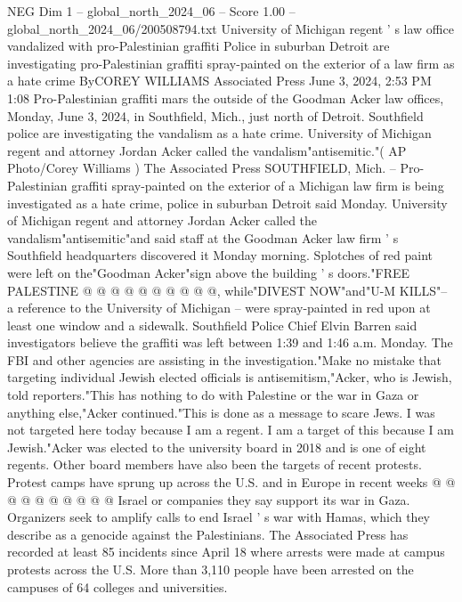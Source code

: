 \begin{textsample}{NEG Dim 1 – global\_north\_2024\_06 – Score 1.00 – global\_north\_2024\_06/200508794.txt}  \label{ex:f1_neg_216}
University of Michigan regent ' s law office vandalized with pro-Palestinian graffiti Police in suburban Detroit are investigating pro-Palestinian graffiti spray-painted on the exterior of a law firm as a hate crime ByCOREY WILLIAMS Associated Press June 3, 2024, 2:53 PM 1:08 Pro-Palestinian graffiti mars the outside of the Goodman Acker law offices, Monday, June 3, 2024, in Southfield, Mich., just north of Detroit.
Southfield police are investigating the vandalism as a hate crime.
University of Michigan regent and attorney Jordan Acker called the vandalism"antisemitic."( AP Photo/Corey Williams ) The Associated Press SOUTHFIELD, Mich. -- Pro-Palestinian graffiti spray-painted on the exterior of a Michigan law firm is being investigated as a hate crime, police in suburban Detroit said Monday.
University of Michigan regent and attorney Jordan Acker called the vandalism"antisemitic"and said staff at the Goodman Acker law firm ' s Southfield headquarters discovered it Monday morning.
Splotches of red paint were left on the"Goodman Acker"sign above the building ' s doors."FREE PALESTINE @ @ @ @ @ @ @ @ @ @, while"DIVEST NOW"and"U-M KILLS"-- a reference to the University of Michigan -- were spray-painted in red upon at least one window and a sidewalk.
Southfield Police Chief Elvin Barren said investigators believe the graffiti was left between 1:39 and 1:46 a.m.
Monday.
The FBI and other agencies are assisting in the investigation."Make no mistake that targeting individual Jewish elected officials is antisemitism,"Acker, who is Jewish, told reporters."This has nothing to do with Palestine or the war in Gaza or anything else,"Acker continued."This is done as a message to scare Jews.
I was not targeted here today because I am a regent.
I am a target of this because I am Jewish."Acker was elected to the university board in 2018 and is one of eight regents.
Other board members have also been the targets of recent protests.
Protest camps have sprung up across the U.S. and in Europe in recent weeks @ @ @ @ @ @ @ @ @ @ Israel or companies they say support its war in Gaza.
Organizers seek to amplify calls to end Israel ' s war with Hamas, which they describe as a genocide against the Palestinians.
The Associated Press has recorded at least 85 incidents since April 18 where arrests were made at campus protests across the U.S.
More than 3,110 people have been arrested on the campuses of 64 colleges and universities.

\end{textsample}
